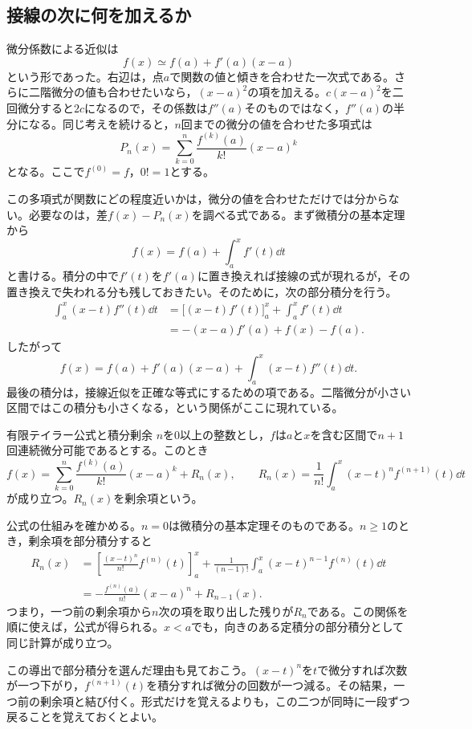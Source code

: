 \subsection{接線の次に何を加えるか}

微分係数による近似は
\[
 f(x)\simeq f(a)+f'(a)(x-a)
\]
という形であった。右辺は，点$a$で関数の値と傾きを合わせた一次式である。さらに二階微分の値も合わせたいなら，$(x-a)^2$の項を加える。$c(x-a)^2$を二回微分すると$2c$になるので，その係数は$f''(a)$そのものではなく，$f''(a)$の半分になる。同じ考えを続けると，$n$回までの微分の値を合わせた多項式は
\[
 P_n(x)=\sum_{k=0}^{n}\frac{f^{(k)}(a)}{k!}(x-a)^k
\]
となる。ここで$f^{(0)}=f$，$0!=1$とする。

この多項式が関数にどの程度近いかは，微分の値を合わせただけでは分からない。必要なのは，差$f(x)-P_n(x)$を調べる式である。まず微積分の基本定理から
\[
 f(x)=f(a)+\int_a^x f'(t)\dd t
\]
と書ける。積分の中で$f'(t)$を$f'(a)$に置き換えれば接線の式が現れるが，その置き換えで失われる分も残しておきたい。そのために，次の部分積分を行う。
\[
\begin{aligned}
 \int_a^x (x-t)f''(t)\dd t
 &=\bigl[(x-t)f'(t)\bigr]_a^x
   +\int_a^x f'(t)\dd t\\
 &=-(x-a)f'(a)+f(x)-f(a).
\end{aligned}
\]
したがって
\[
 f(x)=f(a)+f'(a)(x-a)
      +\int_a^x(x-t)f''(t)\dd t.
\]
最後の積分は，接線近似を正確な等式にするための項である。二階微分が小さい区間ではこの積分も小さくなる，という関係がここに現れている。

\begin{theorem}{有限テイラー公式と積分剰余}
$n$を$0$以上の整数とし，$f$は$a$と$x$を含む区間で$n+1$回連続微分可能であるとする。このとき
\[
 f(x)=\sum_{k=0}^{n}\frac{f^{(k)}(a)}{k!}(x-a)^k+R_n(x),
 \qquad
 R_n(x)=\frac{1}{n!}\int_a^x(x-t)^n f^{(n+1)}(t)\dd t
\]
が成り立つ。$R_n(x)$を剰余項という。
\end{theorem}

公式の仕組みを確かめる。$n=0$は微積分の基本定理そのものである。$n\geq1$のとき，剰余項を部分積分すると
\[
\begin{aligned}
 R_n(x)
 &=\left[\frac{(x-t)^n}{n!}f^{(n)}(t)\right]_a^x
   +\frac{1}{(n-1)!}\int_a^x(x-t)^{n-1}f^{(n)}(t)\dd t\\
 &=-\frac{f^{(n)}(a)}{n!}(x-a)^n+R_{n-1}(x).
\end{aligned}
\]
つまり，一つ前の剰余項から$n$次の項を取り出した残りが$R_n$である。この関係を順に使えば，公式が得られる。$x<a$でも，向きのある定積分の部分積分として同じ計算が成り立つ。

この導出で部分積分を選んだ理由も見ておこう。$(x-t)^n$を$t$で微分すれば次数が一つ下がり，$f^{(n+1)}(t)$を積分すれば微分の回数が一つ減る。その結果，一つ前の剰余項と結び付く。形式だけを覚えるよりも，この二つが同時に一段ずつ戻ることを覚えておくとよい。

